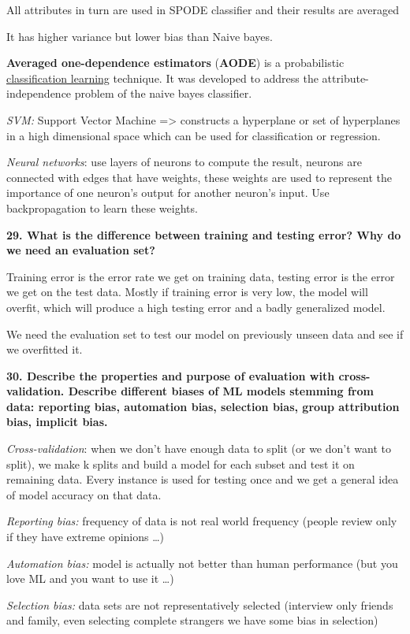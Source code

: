 All attributes in turn are used in SPODE classifier and their results
are averaged

It has higher variance but lower bias than Naive bayes.

\textbf{Averaged one-dependence estimators} (\textbf{AODE}) is a
probabilistic
\href{https://en.wikipedia.org/wiki/Classifier_(mathematics)}{classification
learning} technique. It was developed to address the
attribute-independence problem of the naive bayes classifier.

\textit{SVM:} Support Vector Machine =\textgreater{} constructs a
hyperplane or set of hyperplanes in a high dimensional space which can
be used for classification or regression.

\textit{Neural networks}: use layers of neurons to compute the
result, neurons are connected with edges that have weights, these
weights are used to represent the importance of one neuron's output for
another neuron's input. Use backpropagation to learn these weights.

\textbf{29. What is the difference between training and testing error?
Why do we need an evaluation set?}

Training error is the error rate we get on training data, testing error
is the error we get on the test data. Mostly if training error is very
low, the model will overfit, which will produce a high testing error and
a badly generalized model.

We need the evaluation set to test our model on previously unseen data
and see if we overfitted it.

\textbf{30. Describe the properties and purpose of evaluation with
cross-validation. Describe different biases of ML models stemming from
data: reporting bias, automation bias, selection bias, group attribution
bias, implicit bias.}

\textit{Cross-validation}: when we don't have enough data to split
(or we don't want to split), we make k splits and build a model for each
subset and test it on remaining data. Every instance is used for testing
once and we get a general idea of model accuracy on that data.

\textit{Reporting bias:} frequency of data is not real world
frequency (people review only if they have extreme opinions \ldots)

\textit{Automation bias:} model is actually not better than human
performance (but you love ML and you want to use it \ldots)

\textit{Selection bias:} data sets are not representatively selected
(interview only friends and family, even selecting complete strangers we
have some bias in selection)

